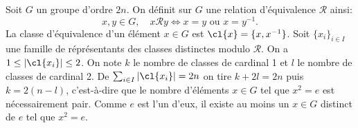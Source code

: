 Soit $G$ un groupe d'ordre $2n$. On définit sur $G$ une relation d'équivalence
$\mathcal{R}$ ainsi:
\[
  x,y\in G,\quad x \mathcal{R} y \Leftrightarrow x = y \text{ ou } x = y^{-1}.
\]
La classe d'équivalence d'un élément $x\in G$ est $\cl{x} = \{ x, x^{-1} \}$.
Soit $\{ x_i \}_{i\in I}$ une famille de réprésentants des classes distinctes
modulo $\mathcal{R}$.  On a $1 \leq |\cl{x_i}| \leq 2$. On note $k$ le nombre
de classes de cardinal 1 et $l$ le nombre de classes de cardinal 2. De
$\sum_{i\in I} |\cl{x_i}| = 2n$ on tire $k+2l = 2n$ puis $k = 2(n-l)$,
c'est-à-dire que le nombre d'éléments $x\in G$ tel que $x^2=e$ est
nécessairement pair. Comme $e$ est l'un d'eux, il existe au moins un $x\in G$
distinct de $e$ tel que $x^2 = e$.


